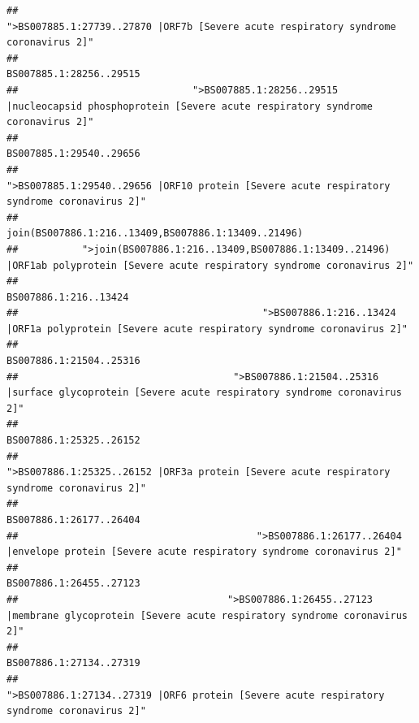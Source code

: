 \documentclass[
]{article}
\begin{document}
\begin{verbatim}
##                                                    ">BS007885.1:27739..27870 |ORF7b [Severe acute respiratory syndrome coronavirus 2]" 
##                                                                                                                BS007885.1:28256..29515 
##                              ">BS007885.1:28256..29515 |nucleocapsid phosphoprotein [Severe acute respiratory syndrome coronavirus 2]" 
##                                                                                                                BS007885.1:29540..29656 
##                                            ">BS007885.1:29540..29656 |ORF10 protein [Severe acute respiratory syndrome coronavirus 2]" 
##                                                                                    join(BS007886.1:216..13409,BS007886.1:13409..21496) 
##           ">join(BS007886.1:216..13409,BS007886.1:13409..21496) |ORF1ab polyprotein [Severe acute respiratory syndrome coronavirus 2]" 
##                                                                                                                  BS007886.1:216..13424 
##                                          ">BS007886.1:216..13424 |ORF1a polyprotein [Severe acute respiratory syndrome coronavirus 2]" 
##                                                                                                                BS007886.1:21504..25316 
##                                     ">BS007886.1:21504..25316 |surface glycoprotein [Severe acute respiratory syndrome coronavirus 2]" 
##                                                                                                                BS007886.1:25325..26152 
##                                            ">BS007886.1:25325..26152 |ORF3a protein [Severe acute respiratory syndrome coronavirus 2]" 
##                                                                                                                BS007886.1:26177..26404 
##                                         ">BS007886.1:26177..26404 |envelope protein [Severe acute respiratory syndrome coronavirus 2]" 
##                                                                                                                BS007886.1:26455..27123 
##                                    ">BS007886.1:26455..27123 |membrane glycoprotein [Severe acute respiratory syndrome coronavirus 2]" 
##                                                                                                                BS007886.1:27134..27319 
##                                             ">BS007886.1:27134..27319 |ORF6 protein [Severe acute respiratory syndrome coronavirus 2]" 

\end{verbatim}
\end{document}
